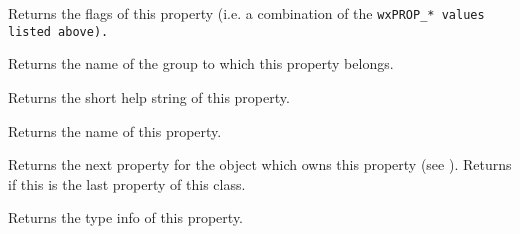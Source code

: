 
Returns the flags of this property (i.e. a combination of the \tt{wxPROP_*} values listed above).


\label{wxpropertyinfogetgroupstring}


Returns the name of the group to which this property belongs.


\label{wxpropertyinfogethelpstring}


Returns the short help string of this property.


\label{wxpropertyinfogetname}


Returns the name of this property.


\label{wxpropertyinfogetnext}


Returns the next property for the  object which
owns this property (see ).
Returns \NULL if this is the last property of this class.


\label{wxpropertyinfogettypeinfo}


Returns the type info of this property.
